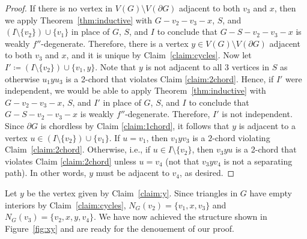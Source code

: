 \documentclass[11pt]{article}
\theoremstyle{slantthm}
\numberwithin{equation}{section}
\theoremstyle{definition}
\newcommand{\defeq}{\coloneqq}
\numberwithin{equation}{section}
\newcommand{\0}{\varnothing}
\newcommand{\set}[1]{\{#1\}}
\newcommand{\bdry}[1]{{\partial #1}}
\begin{document}
\begin{proof}
        If there is no vertex in $V(G) \setminus V(\bdry{G})$ adjacent to both $v_3$ and $x$, then we apply Theorem~\ref{thm:inductive} with $G - v_2 - v_3 - x$, $S$, and $(I \setminus \set{v_2}) \cup \set{v_1}$ in place of $G$, $S$, and $I$ to conclude that $G - S - v_2 - v_3 - x$ is weakly $f''$-degenerate. Therefore, there is a vertex $y \in V(G) \setminus V(\bdry{G})$ adjacent to both $v_3$ and $x$, and it is unique by Claim~\ref{claim:cycles}. %
        Now let $I' \defeq (I \setminus \set{v_2}) \cup \set{v_1, y}$. Note that $y$ is not adjacent to all $3$ vertices in $S$ as otherwise $u_1yu_3$ is a 2-chord that violates Claim \ref{claim:2chord}. Hence, if $I'$ were independent, we would be able to apply Theorem~\ref{thm:inductive} with $G - v_2 - v_3 - x$, $S$, and $I'$ in place of $G$, $S$, and $I$ to conclude that $G - S - v_2 - v_3 - x$ is weakly $f''$-degenerate. Therefore, $I'$ is not independent. Since $\bdry{G}$ is chordless by Claim \ref{claim:1chord}, it follows that $y$ is adjacent to a vertex $u \in (I \setminus \set{v_2}) \cup \set{v_1}$. If $u = v_1$, then $v_1 y v_3$ is a $2$-chord violating Claim~\ref{claim:2chord}. Otherwise, i.e., if $u \in I \setminus \set{v_2}$, then $v_3yu$ is a 2-chord that violates Claim \ref{claim:2chord} unless $u = v_4$ (not that $v_3 y v_4$ is not a separating path). In other words, $y$ must be adjacent to $v_4$, as desired. %
    \end{proof}

    Let $y$ be the vertex given by Claim~\ref{claim:y}. Since triangles in $G$ have empty interiors by Claim~\ref{claim:cycles}, $N_G(v_2) = \set{v_1, x, v_3}$ and $N_G(v_3) = \set{v_2, x, y, v_4}$. We have now achieved the structure shown in Figure~\ref{fig:xy} and are ready for the denouement of our proof.
\end{document}

